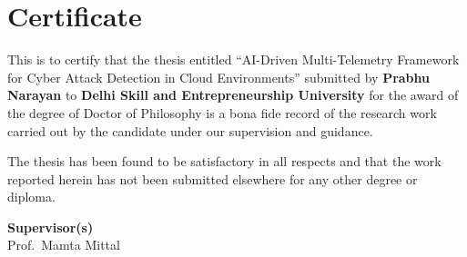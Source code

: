 \chapter*{Certificate}
This is to certify that the thesis entitled ``AI-Driven Multi-Telemetry Framework for Cyber Attack Detection in Cloud Environments'' submitted by \textbf{Prabhu Narayan} to \textbf{Delhi Skill and Entrepreneurship University} for the award of the degree of Doctor of Philosophy is a bona fide record of the research work carried out by the candidate under our supervision and guidance.

The thesis has been found to be satisfactory in all respects and that the work reported herein has not been submitted elsewhere for any other degree or diploma.

\vspace{1.5cm}
\begin{flushleft}
\textbf{Supervisor(s)}\\[1cm]
Prof.~Mamta Mittal

\end{flushleft}
\cleardoublepage
